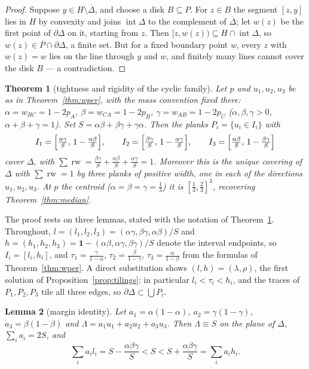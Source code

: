 \documentclass[11pt,reqno]{amsart}
\theoremstyle{plain}
\newtheorem{theorem}{Theorem}[section]
\newtheorem{lemma}[theorem]{Lemma}
\theoremstyle{definition}
\theoremstyle{remark}
\newcommand{\rw}{\operatorname{rw}}
\begin{document}
\begin{proof}
Suppose $y\in H\setminus\overline\Delta$, and choose a disk $B\subseteq P$. For
$z\in B$ the segment $[z,y]$ lies in $H$ by convexity and joins
$\operatorname{int}\Delta$ to the complement of $\overline\Delta$; let $w(z)$ be
the first point of $\partial\Delta$ on it, starting from $z$. Then
$[z,w(z))\subseteq H\cap\operatorname{int}\Delta$, so
$w(z)\in\overline P\cap\partial\Delta$, a finite set. But for a fixed boundary
point $w$, every $z$ with $w(z)=w$ lies on the line through $y$ and $w$, and
finitely many lines cannot cover the disk $B$ --- a contradiction.
\end{proof}

\begin{theorem}[tightness and rigidity of the cyclic family]\label{thm:tight}
Let $p$ and $u_1,u_2,u_3$ be as in Theorem~\ref{thm:wper}, with the mass
convention fixed there: $\alpha=w_{BC}=1-2p_A$, $\beta=w_{CA}=1-2p_B$,
$\gamma=w_{AB}=1-2p_C$ ($\alpha,\beta,\gamma>0$, $\alpha+\beta+\gamma=1$). Set
$S=\alpha\beta+\beta\gamma+\gamma\alpha$. Then the planks $P_i=\{u_i\in I_i\}$
with
\[
I_1=\Bigl[\tfrac{\alpha\gamma}S,\,1-\tfrac{\alpha\beta}S\Bigr],\qquad
I_2=\Bigl[\tfrac{\beta\gamma}S,\,1-\tfrac{\alpha\gamma}S\Bigr],\qquad
I_3=\Bigl[\tfrac{\alpha\beta}S,\,1-\tfrac{\beta\gamma}S\Bigr]
\]
cover $\Delta$, with $\sum\rw
=\tfrac{\beta\gamma}S+\tfrac{\alpha\beta}S+\tfrac{\alpha\gamma}S=1$. Moreover
this is the unique covering of $\Delta$ with $\sum\rw=1$ by three planks of
positive width, one in each of the directions $u_1,u_2,u_3$. At $p$ the centroid
($\alpha=\beta=\gamma=\tfrac13$) it is $[\tfrac13,\tfrac23]^3$, recovering
Theorem~\ref{thm:median}.
\end{theorem}

The proof rests on three lemmas, stated with the notation of
Theorem~\ref{thm:tight}. Throughout,
$l=(l_1,l_2,l_3)=(\alpha\gamma,\beta\gamma,\alpha\beta)/S$ and
$h=(h_1,h_2,h_3)=\mathbf1-(\alpha\beta,\alpha\gamma,\beta\gamma)/S$ denote the
interval endpoints, so $I_i=[l_i,h_i]$, and
$\tau_1=\frac{\gamma}{1-\alpha}$, $\tau_2=\frac{\beta}{1-\gamma}$,
$\tau_3=\frac{\alpha}{1-\beta}$ from the formulas of Theorem~\ref{thm:wper}. A
direct substitution shows $(l,h)=(\lambda,\rho)$, the first solution of
Proposition~\ref{prop:tilings}; in particular $l_i<\tau_i<h_i$, and the traces
of $P_1,P_2,P_3$ tile all three edges, so $\partial\Delta\subset\bigcup P_i$.

\begin{lemma}[margin identity]\label{lem:margin}
Let $a_1=\alpha(1-\alpha)$, $a_2=\gamma(1-\gamma)$, $a_3=\beta(1-\beta)$ and
$\Lambda=a_1u_1+a_2u_2+a_3u_3$. Then $\Lambda\equiv S$ on the plane of
$\Delta$, $\sum_ia_i=2S$, and
\begin{equation}\label{eq:margin}
\textstyle\sum_i a_il_i=S-\frac{\alpha\beta\gamma}S<S<
S+\frac{\alpha\beta\gamma}S=\sum_i a_ih_i .
\end{equation}
\end{lemma}
\end{document}
